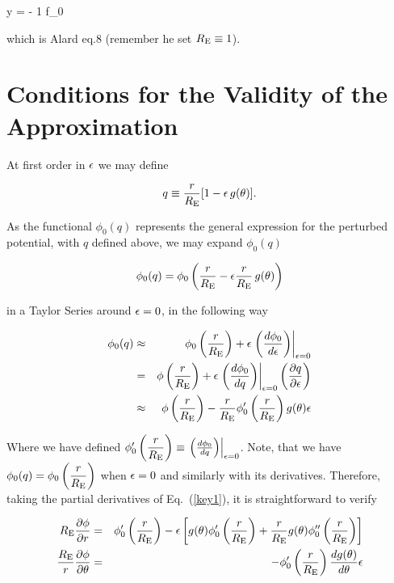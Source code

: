 \beq
\label{eq:rsexpanded}
 y = \left[ \kt x - f_1 \right]  - {1 \over \re} {\prtl f_0 \over \prtl \te}  \hat{\theta}
\eeq

which is Alard eq.8 (remember he set $R_{\mathrm{E}} \equiv 1$).


\section{Conditions for the Validity of the Approximation}

At first order in $\epsilon$ we may define

\begin{equation}
 q \equiv \frac{r}{R_{\mathrm{E}}}[1-\epsilon\,g(\theta)].
\end{equation}

As the functional $\phi_0(q)$ represents the general expression
for the perturbed potential, with $q$ defined above, we may expand $\phi_0(q)$

\begin{displaymath}
 \phi_0(q)=\phi_0\left(\dfrac{r}{R_{\mathrm{E}}}-\epsilon\dfrac{r}{R_{\mathrm{E}}}\,g(\theta)\right)
\end{displaymath}

\noindent in a Taylor Series around $\epsilon=0$, in the following way

\def\dpdq{ \left. \left( \frac{d\phi_0}{dq}\right) \right|_{\eps=0} }
\def\dpde{ \left. \left( \frac{d\phi_0}{d\eps}\right) \right|_{\eps=0} }

\begin{eqnarray}
 \phi_0(q) &\approx& \phi_0\prre+\eps \dpde \\
	  & = & \phi\prre+\eps \dpdq  \left(\frac{\prtl q}{\prtl \eps}\right)\\
	  &\approx& \phi\prre-\rre\phi_0^\prime\prre g(\te)\eps \label{key1}
\end{eqnarray}

Where we have defined $\phi_0^\prime\prre \equiv  \dpdq$.  Note, that we have $\phi_0(q)=\phi_0\left( \dfrac{r}{R_{\mathrm{E}}}\right)$ when $\epsilon=0$ and similarly with its derivatives. Therefore,
taking the partial derivatives of Eq.~(\ref{key1}), it is straightforward to verify

\begin{eqnarray}
 \re\frac{\prtl \phi}{\prtl r}&=& \phi_0^\prime\prre -%
  \eps\left[g(\te)\phi_0^\prime\prre+\rre g(\te)\phi_0^{\prime \prime}\prre\right]\\
\frac{\re}{r}\frac{\prtl \phi}{\prtl \te}&=&-\phi_0^\prime\prre \frac{dg(\te)}{d\te}\eps
\end{eqnarray}

